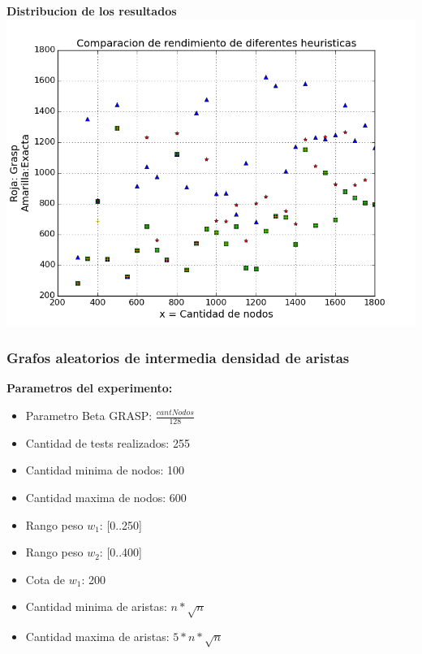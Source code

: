 \vspace{2cm}

\begin{center}	
	\textbf{Distribucion de los resultados}\\
	\includegraphics[scale=0.7]{experimentos/performance-optimalidad-lineales-beta_n_over_128/comparacion_optimalidad.png}
\end{center}


\subsubsection{Grafos aleatorios de intermedia densidad de aristas}
\textbf{Parametros del experimento:}
\begin{itemize}
	\item Parametro Beta GRASP: $\frac{cantNodos}{128}$
	\item Cantidad de tests realizados: 255
	\item Cantidad minima de nodos: 100
	\item Cantidad maxima de nodos: 600
	\item Rango peso $w_1$: [0..250]
	\item Rango peso $w_2$: [0..400]
	\item Cota de $w_1$: 200
	\item Cantidad minima de aristas: $ n * \sqrt n$
	\item Cantidad maxima de aristas: $ 5 * n * \sqrt n$
\end{itemize}

